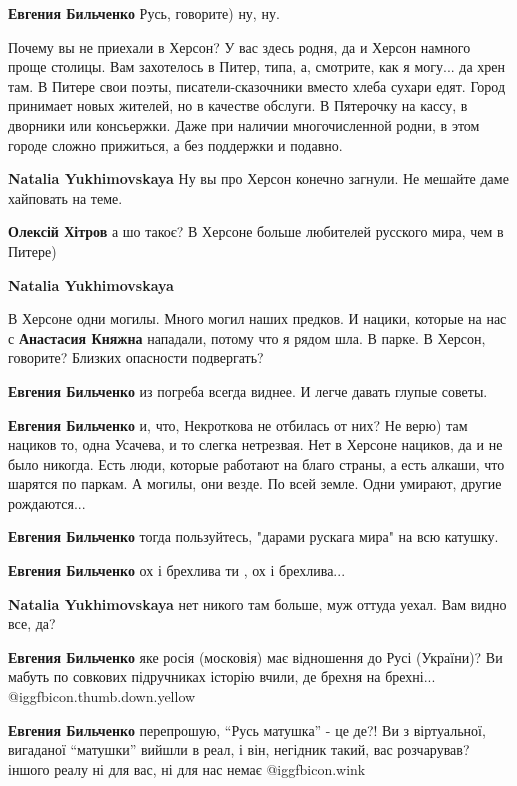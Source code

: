 \begin{itemize}
\begin{itemize}
\textbf{Евгения Бильченко} Русь, говорите) ну, ну.


Почему вы не приехали в Херсон? У вас здесь родня, да и Херсон намного проще
столицы. Вам захотелось в Питер, типа, а, смотрите, как я могу... да хрен там.
В Питере свои поэты, писатели-сказочники вместо хлеба сухари едят. Город
принимает новых жителей, но в качестве обслуги. В Пятерочку на кассу, в
дворники или консьержки. Даже при наличии многочисленной родни, в этом городе
сложно прижиться, а без поддержки и подавно.


\textbf{Natalia Yukhimovskaya} Ну вы про Херсон конечно загнули. Не мешайте даме хайповать на теме.

\textbf{Олексій Хітров} а шо такоє? В Херсоне больше любителей русского мира, чем в Питере)

\textbf{Natalia Yukhimovskaya} 

В Херсоне одни могилы. Много могил наших предков. И нацики, которые на нас с
\textbf{Анастасия Княжна} нападали, потому что я рядом шла. В парке. В Херсон,
говорите? Близких опасности подвергать?

\textbf{Евгения Бильченко} из погреба всегда виднее. И легче давать глупые советы.

\textbf{Евгения Бильченко} и, что, Некроткова не отбилась от них? Не верю) там нациков то, одна Усачева, и то слегка нетрезвая.
Нет в Херсоне нациков, да и не было никогда. Есть люди, которые работают на благо страны, а есть алкаши, что шарятся по паркам. А могилы, они везде. По всей земле. Одни умирают, другие рождаются...

\textbf{Евгения Бильченко} тогда пользуйтесь, "дарами рускага мира" на всю катушку.

\textbf{Евгения Бильченко} ох і брехлива ти , ох і брехлива...


\textbf{Natalia Yukhimovskaya} нет никого там больше, муж оттуда уехал. Вам видно все, да?

\textbf{Евгения Бильченко} яке росія (московія) має відношення до Русі (України)? Ви мабуть по совкових підручниках історію вчили, де брехня на брехні...  @igg{fbicon.thumb.down.yellow} 

\textbf{Евгения Бильченко} перепрошую, \enquote{Русь матушка} - це де?! Ви з віртуальної, вигаданої \enquote{матушки} вийшли в реал, і він, негідник такий, вас розчарував? іншого реалу ні для вас, ні для нас немає  @igg{fbicon.wink} 


\end{itemize}
\end{itemize}
